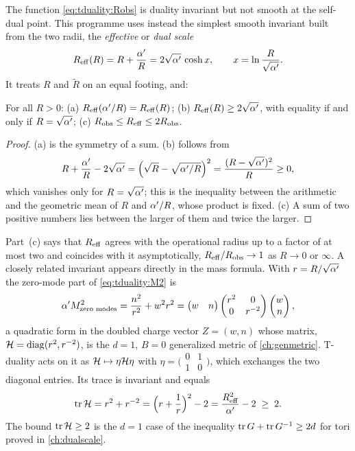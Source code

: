 The function \eqref{eq:tduality:Robs} is duality invariant but not smooth at the self-dual
point. This programme uses instead the simplest smooth invariant built from the two radii,
the \emph{effective} or \emph{dual scale}
\begin{equation}\label{eq:tduality:Reff}
  R_{\rm eff}(R)=R+\frac{\alpha'}{R}=2\sqrt{\alpha'}\,\cosh x,\qquad x=\ln\frac{R}{\sqrt{\alpha'}} .
\end{equation}
It treats $R$ and $\tilde R$ on an equal footing, and:
\begin{proposition}\label{thm:tduality:Reff}
For all $R>0$: (a) $R_{\rm eff}(\alpha'/R)=R_{\rm eff}(R)$; (b) $R_{\rm eff}(R)\ge2\sqrt{\alpha'}$, with
equality if and only if $R=\sqrt{\alpha'}$; (c) $R_{\rm obs}\le R_{\rm eff}\le2R_{\rm obs}$.
\end{proposition}
\begin{proof}
(a) is the symmetry of a sum. (b) follows from
\[
  R+\frac{\alpha'}{R}-2\sqrt{\alpha'}=\Big(\sqrt R-\sqrt{\alpha'/R}\Big)^2=\frac{(R-\sqrt{\alpha'})^2}{R}\ge0,
\]
which vanishes only for $R=\sqrt{\alpha'}$; this is the inequality between the arithmetic and the
geometric mean of $R$ and $\alpha'/R$, whose product is fixed. (c) A sum of two positive numbers
lies between the larger of them and twice the larger.
\end{proof}
Part~(c) says that $R_{\rm eff}$ agrees with the operational radius up to a factor of at most two
and coincides with it asymptotically, $R_{\rm eff}/R_{\rm obs}\to1$ as $R\to0$ or $\infty$. A
closely related invariant appears directly in the mass formula. With $r=R/\sqrt{\alpha'}$ the
zero-mode part of \eqref{eq:tduality:M2} is
\begin{equation}\label{eq:tduality:massform}
  \alpha' M^2_{\text{zero modes}}=\frac{n^2}{r^2}+w^2r^2=
   \begin{pmatrix}w&n\end{pmatrix}\begin{pmatrix}r^2&0\\0&r^{-2}\end{pmatrix}
   \begin{pmatrix}w\\n\end{pmatrix},
\end{equation}
a quadratic form in the doubled charge vector $Z=(w,n)$ whose matrix,
$\mathcal{H}=\operatorname{diag}(r^2,r^{-2})$, is the $d=1$, $B=0$ generalized metric of
\cref{ch:genmetric}. T-duality acts on it as $\mathcal{H}\mapsto\eta\mathcal{H}\eta$ with
$\eta=\big(\begin{smallmatrix}0&1\\1&0\end{smallmatrix}\big)$, which exchanges the two diagonal
entries. Its trace is invariant and equals
\begin{equation}\label{eq:tduality:trace}
  \operatorname{tr}\mathcal{H}=r^2+r^{-2}=\Big(r+\frac1r\Big)^2-2=\frac{R_{\rm eff}^2}{\alpha'}-2\;\ge\;2 .
\end{equation}
The bound $\operatorname{tr}\mathcal{H}\ge2$ is the $d=1$ case of the inequality $\operatorname{tr} G+\operatorname{tr} G^{-1}\ge2d$ for tori
proved in \cref{ch:dualscale}.

